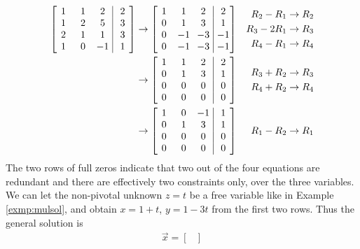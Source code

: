 \begin{solution}
\begin{align*}
\left[\begin{array}{@{\,}wc{10pt}wc{10pt}wc{10pt}|wc{10pt}@{\,}}
1 & 1 & 2 & 2 \\
1 & 2 & 5 & 3 \\
2 & 1 & 1 & 3 \\
1 & 0 & -1 & 1
\end{array}\right] 
& \to 
\left[\begin{array}{@{\,}wc{10pt}wc{10pt}wc{10pt}|wc{10pt}@{\,}}
1 & 1 & 2 & 2 \\
0 & 1 & 3 & 1 \\
0 & -1 & -3 & -1\\
0 & -1 & -3 & -1
\end{array}\right] 
& \begin{aligned}
R_2 - R_1 &\to R_2\\
R_3 - 2R_1 &\to R_3 \\
R_4 - R_1 &\to R_4
\end{aligned}\\ 
& \to 
\left[\begin{array}{@{\,}wc{10pt}wc{10pt}wc{10pt}|wc{10pt}@{\,}}
1 & 1 & 2 & 2 \\
0 & 1 & 3 & 1 \\
0 & 0 & 0 & 0 \\
0 & 0 & 0 & 0
\end{array}\right] 
& \begin{aligned}
R_3 + R_2 &\to R_3\\
R_4 + R_2 &\to R_4    
\end{aligned} \\
& \to 
\left[\begin{array}{@{\,}wc{10pt}wc{10pt}wc{10pt}|wc{10pt}@{\,}}
1 & 0 & -1 & 1 \\
0 & 1 & 3 & 1 \\
0 & 0 & 0 & 0 \\
0 & 0 & 0 & 0
\end{array}\right] 
& R_1- R_2 \to R_1 
\end{align*}
The two rows of full zeros indicate that two out of the four equations are redundant and there are effectively two constraints only, over the three variables. We can let the non-pivotal unknown $z = t$ be a free variable like in Example \ref{exmp:mulsol}, and obtain $x = 1+t$, $y = 1-3t$ from the first two rows. Thus the general solution is
\begin{align*}
\vec{x} = 
\begin{bmatrix}

\end{bmatrix}
\end{align*}
\end{solution}
